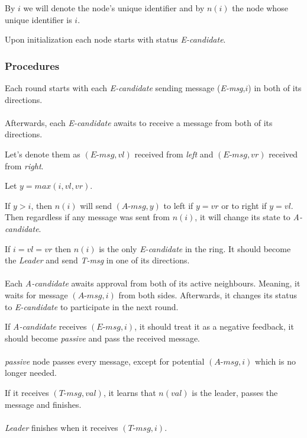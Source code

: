 \documentclass{article}
\begin{document}
By $i$ we will denote the node's unique identifier and by $n(i)$ the node whose unique identifier is $i$.

Upon initialization each node starts with status \textit{E-candidate}.
\subsubsection*{Procedures}
Each round starts with each \textit{E-candidate} sending message (\textit{E-msg},$i$) in both of its directions.
\paragraph{}
Afterwards, each \textit{E-candidate} awaits to receive a message from both of its directions.

Let's denote them as $(\textit{E-msg},vl)$ received from \textit{left} and $(\textit{E-msg},vr)$ received from \textit{right}.

Let $y=max(i,vl,vr)$.

If $y>i$, then $n(i)$ will send $(\textit{A-msg},y)$ to left if $y=vr$ or to right if $y=vl$.
Then regardless if any message was sent from $n(i)$, it will change its state to \textit{A-candidate}.

If $i=vl=vr$ then $n(i)$ is the only \textit{E-candidate} in the ring. It should become the \textit{Leader} and send \textit{T-msg} in one of its directions.
\paragraph{}
Each \textit{A-candidate} awaits approval from both of its active neighbours. Meaning, it waits for message $(\textit{A-msg},i)$ from both sides. Afterwards, it changes its status to \textit{E-candidate} to participate in the next round.

If \textit{A-candidate} receives $(\textit{E-msg},i)$, it should treat it as a negative feedback, it should become \textit{passive} and pass the received message.
\paragraph{}
\textit{passive} node passes every message, except for potential $(\textit{A-msg},i)$ which is no longer needed.

If it receives $(\textit{T-msg},val)$, it learns that $n(val)$ is the leader, passes the message and finishes.
\paragraph{}
\textit{Leader} finishes when it receives $(\textit{T-msg},i)$.
\end{document}
